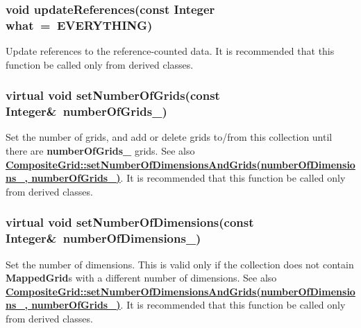 \documentclass{article}
\begin{document}
  \subsubsection{void updateReferences(const Integer what~=~EVERYTHING)}
  \label{CompositeGrid::updateReferences(what)}
    Update references to the reference-counted data.
    It is recommended that this function be called only from derived classes.

  \subsubsection{virtual void setNumberOfGrids(const Integer\&~numberOfGrids\_)}
  \label{CompositeGrid::setNumberOfGrids(numberOfGrids_)}
    Set the number of grids, and add or delete grids to/from this collection until there are \textbf{numberOfGrids\_} grids.
    See also {\bf{}\hyperref{setNumberOfDimensionsAndGrids(numberOfDimensions\_, numberOfGrids\_)}{setNumberOfDimensionsAndGrids(numberOfDimensions\_, numberOfGrids\_) \rm(\S}{)}{CompositeGrid::setNumberOfDimensionsAndGrids(numberOfDimensions_, numberOfGrids_)}}.
    It is recommended that this function be called only from derived classes.

  \subsubsection{virtual void setNumberOfDimensions(const Integer\&~numberOfDimensions\_)}
  \label{CompositeGrid::setNumberOfDimensions(numberOfDimensions)}
    Set the number of dimensions.  This is valid only if the collection does not contain \textbf{MappedGrid}s with a different number of dimensions.
    See also {\bf{}\hyperref{setNumberOfDimensionsAndGrids(numberOfDimensions\_, numberOfGrids\_)}{setNumberOfDimensionsAndGrids(numberOfDimensions\_, numberOfGrids\_) \rm(\S}{)}{CompositeGrid::setNumberOfDimensionsAndGrids(numberOfDimensions_, numberOfGrids_)}}.
    It is recommended that this function be called only from derived classes.
\end{document}
